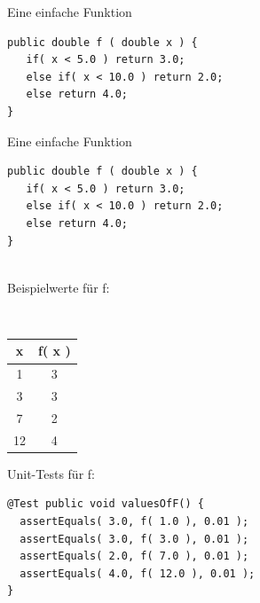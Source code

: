 \begin{frame}[t,fragile]{Eine einfache Funktion} %
\begin{lstlisting}
public double f ( double x ) {
   if( x < 5.0 ) return 3.0;
   else if( x < 10.0 ) return 2.0;
   else return 4.0;
}
\end{lstlisting}

\begin{minipage}[t]{3.5cm}
\end{minipage} 
\hfill

\end{frame}
\begin{frame}[t,fragile]{Eine einfache Funktion} %
\begin{lstlisting}
public double f ( double x ) {
   if( x < 5.0 ) return 3.0;
   else if( x < 10.0 ) return 2.0;
   else return 4.0;
}
\end{lstlisting}

\begin{minipage}[t]{3.5cm}
~ \\
Beispielwerte für f:

~ \\
\begin{tabular}{|c|c|}
\textbf{x} & \textbf{f( x )}  \\ \hline
1 & 3  \\
3 & 3  \\
7 & 2  \\
12 & 4
\end{tabular} 
\end{minipage} 
\hfill
\begin{minipage}[t]{7cm}
Unit-Tests für f:

\begin{lstlisting}
@Test public void valuesOfF() {
  assertEquals( 3.0, f( 1.0 ), 0.01 );
  assertEquals( 3.0, f( 3.0 ), 0.01 );
  assertEquals( 2.0, f( 7.0 ), 0.01 );
  assertEquals( 4.0, f( 12.0 ), 0.01 );
}
\end{lstlisting}
\end{minipage}

\end{frame}

